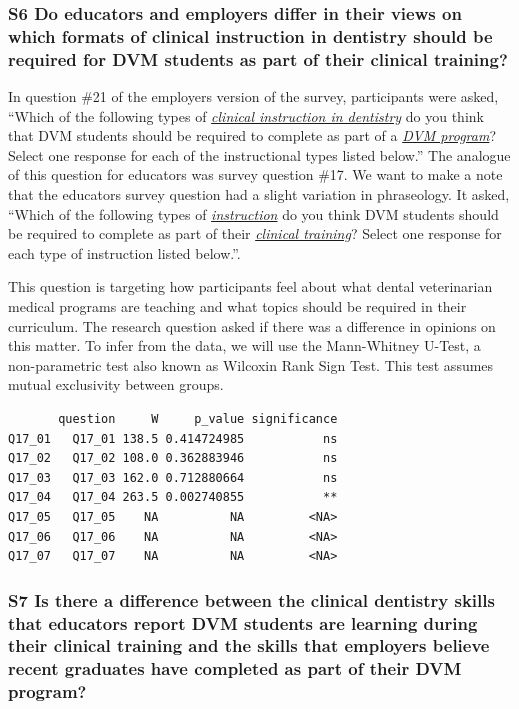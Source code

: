 \documentclass[
  11pt,
  letterpaper,
  DIV=11,
  numbers=noendperiod]{scrartcl}
\numberwithin{figure}{section}
\begin{document}
\subsubsection{S6 Do educators and employers differ in their views on
which formats of clinical instruction in dentistry should be required
for DVM students as part of their clinical
training?}\label{s6-do-educators-and-employers-differ-in-their-views-on-which-formats-of-clinical-instruction-in-dentistry-should-be-required-for-dvm-students-as-part-of-their-clinical-training}

In question \#21 of the employers version of the survey, participants
were asked, ``Which of the following types of \ul{\emph{clinical
instruction in dentistry}} do you think that DVM students should be
required to complete as part of a \ul{\emph{DVM program}}? Select one
response for each of the instructional types listed below.'' The
analogue of this question for educators was survey question \#17. We
want to make a note that the educators survey question had a slight
variation in phraseology. It asked, ``Which of the following types of
\ul{\emph{instruction}} do you think DVM students should be required to
complete as part of their \ul{\emph{clinical training}}? Select one
response for each type of instruction listed below.''.

This question is targeting how participants feel about what dental
veterinarian medical programs are teaching and what topics should be
required in their curriculum. The research question asked if there was a
difference in opinions on this matter. To infer from the data, we will
use the Mann-Whitney U-Test, a non-parametric test also known as
Wilcoxin Rank Sign Test. This test assumes mutual exclusivity between
groups.

\begin{verbatim}
       question     W     p_value significance
Q17_01   Q17_01 138.5 0.414724985           ns
Q17_02   Q17_02 108.0 0.362883946           ns
Q17_03   Q17_03 162.0 0.712880664           ns
Q17_04   Q17_04 263.5 0.002740855           **
Q17_05   Q17_05    NA          NA         <NA>
Q17_06   Q17_06    NA          NA         <NA>
Q17_07   Q17_07    NA          NA         <NA>
\end{verbatim}

\subsubsection{S7 Is there a difference between the clinical dentistry
skills that educators report DVM students are learning during their
clinical training and the skills that employers believe recent graduates
have completed as part of their DVM
program?}\label{s7-is-there-a-difference-between-the-clinical-dentistry-skills-that-educators-report-dvm-students-are-learning-during-their-clinical-training-and-the-skills-that-employers-believe-recent-graduates-have-completed-as-part-of-their-dvm-program}
\end{document}
